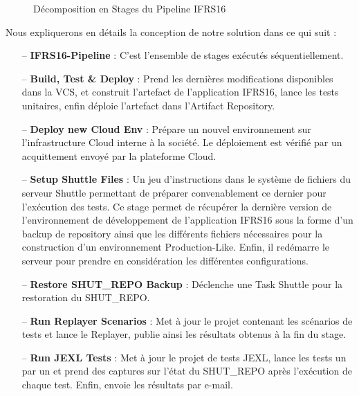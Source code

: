 \begin{spacing}{1.2}
\begin{figure}[!ht]\centering
{}
\caption{Décomposition en Stages du Pipeline IFRS16}
\label{fig:fig1}
\end{figure}
\FloatBarrier
Nous expliquerons en détails la conception de notre solution dans ce qui suit :
\begin{itemize}
\setlength\itemsep{0em}
\item[--] \textbf{IFRS16-Pipeline} : C'est l'ensemble de stages exécutés séquentiellement.
\item[--] \textbf{Build, Test \& Deploy} : Prend les dernières modifications disponibles dans la VCS, et construit l'artefact de l'application IFRS16, lance les tests unitaires, enfin déploie l'artefact dans l'Artifact Repository.
\item[--] \textbf{Deploy new Cloud Env} : Prépare un nouvel environnement sur l'infrastructure Cloud interne à la société. Le déploiement est vérifié par un acquittement envoyé par la plateforme Cloud.
\item[--] \textbf{Setup Shuttle Files} : Un jeu d'instructions dans le système de fichiers du serveur Shuttle permettant de préparer convenablement ce dernier pour l'exécution des tests. Ce stage permet de récupérer la dernière version de l'environnement de développement de l'application IFRS16 sous la forme d'un backup de repository ainsi que les différents fichiers nécessaires pour la construction d'un environnement Production-Like. Enfin, il redémarre le serveur pour prendre en considération les différentes configurations.
\item[--] \textbf{Restore SHUT\_REPO Backup} : Déclenche une Task Shuttle pour la restoration du SHUT\_REPO.
\item[--] \textbf{Run Replayer Scenarios} : Met à jour le projet contenant les scénarios de tests et lance le Replayer, publie ainsi les résultats obtenus à la fin du stage.
\item[--] \textbf{Run JEXL Tests} : Met à jour le projet de tests JEXL, lance les tests un par un et prend des captures sur l'état du SHUT\_REPO après l'exécution de chaque test. Enfin, envoie les résultats par e-mail.

\end{itemize}

\end{spacing}
